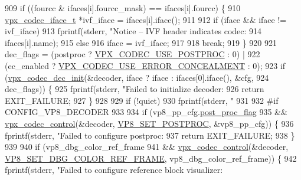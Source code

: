 \begin{DoxyCodeInclude}
{{{{{{{{{{{{{{{{{{{{{{{{{{{{909     \textcolor{keywordflow}{if} ((fourcc & ifaces[i].fourcc\_mask) == ifaces[i].fourcc) \{
910       \hyperlink{group__codec_gae99c3b04f4a567a311211cce3ae6b83b}{vpx\_codec\_iface\_t}  *ivf\_iface = ifaces[i].iface();
911 
912       \textcolor{keywordflow}{if} (iface && iface != ivf\_iface)
913         fprintf(stderr, \textcolor{stringliteral}{"Notice -- IVF header indicates codec: %
914                 ifaces[i].name);
915       \textcolor{keywordflow}{else}
916         iface = ivf\_iface;
917 
918       \textcolor{keywordflow}{break};
919     \}
920 
921   dec\_flags = (postproc ? \hyperlink{group__decoder_ga6fe14f30254aff769412b128b29664cc}{VPX\_CODEC\_USE\_POSTPROC} : 0) |
922               (ec\_enabled ? \hyperlink{group__decoder_ga520d7005e360202f5844982fa2392581}{VPX\_CODEC\_USE\_ERROR\_CONCEALMENT} : 0);
923   \textcolor{keywordflow}{if} (\hyperlink{group__decoder_ga8c2f0b12f1bd4927eb3c68b01eab19d3}{vpx\_codec\_dec\_init}(&decoder, iface ? iface :  ifaces[0].iface(), &cfg,
924                          dec\_flags)) \{
925     fprintf(stderr, \textcolor{stringliteral}{"Failed to initialize decoder: %
926     \textcolor{keywordflow}{return} EXIT\_FAILURE;
927   \}
928 
929   \textcolor{keywordflow}{if} (!quiet)
930     fprintf(stderr, \textcolor{stringliteral}{"%
931 
932 \textcolor{preprocessor}{#if CONFIG\_VP8\_DECODER}
933 
934   \textcolor{keywordflow}{if} (vp8\_pp\_cfg.\hyperlink{structvp8__postproc__cfg_ae9adc230642ac230f39eb4c531cf85e5}{post\_proc\_flag}
935       && \hyperlink{group__codec_gac1b91e04698c1bd4c0a2b8aa85b08cd2}{vpx\_codec\_control}(&decoder, \hyperlink{group__vp8_gga8cadbc8e0af3da96ef7a2dbd4ed06599a43e85c68bc1c1473f4a94b005a59482c}{VP8\_SET\_POSTPROC}, &vp8\_pp\_cfg)) \{
936     fprintf(stderr, \textcolor{stringliteral}{"Failed to configure postproc: %
937     \textcolor{keywordflow}{return} EXIT\_FAILURE;
938   \}
939 
940   \textcolor{keywordflow}{if} (vp8\_dbg\_color\_ref\_frame
941       && \hyperlink{group__codec_gac1b91e04698c1bd4c0a2b8aa85b08cd2}{vpx\_codec\_control}(&decoder, 
      \hyperlink{group__vp8_gga8cadbc8e0af3da96ef7a2dbd4ed06599ab52ea7a97668b603812dfc205b0fd783}{VP8\_SET\_DBG\_COLOR\_REF\_FRAME}, vp8\_dbg\_color\_ref\_frame)) \{
942     fprintf(stderr, \textcolor{stringliteral}{"Failed to configure reference block visualizer: %
}}}}}}}}}}}}}}}}}}}}}}}}}}}}}}}}}
\end{DoxyCodeInclude}
